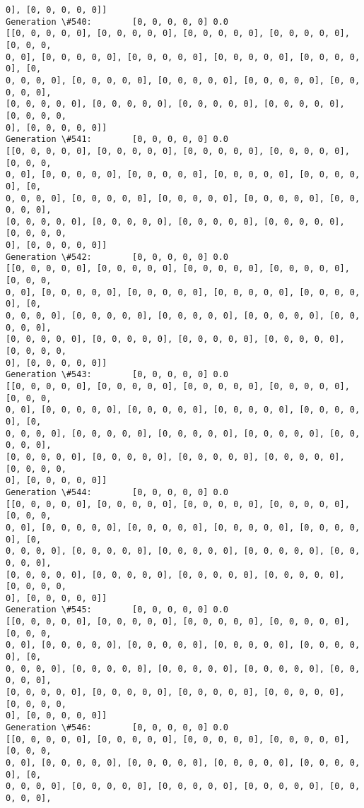 \documentclass[11pt]{article}
\begin{document}
\begin{Verbatim}[commandchars=\\\{\}]
0], [0, 0, 0, 0, 0]]
Generation \#540:        [0, 0, 0, 0, 0] 0.0
[[0, 0, 0, 0, 0], [0, 0, 0, 0, 0], [0, 0, 0, 0, 0], [0, 0, 0, 0, 0], [0, 0, 0,
0, 0], [0, 0, 0, 0, 0], [0, 0, 0, 0, 0], [0, 0, 0, 0, 0], [0, 0, 0, 0, 0], [0,
0, 0, 0, 0], [0, 0, 0, 0, 0], [0, 0, 0, 0, 0], [0, 0, 0, 0, 0], [0, 0, 0, 0, 0],
[0, 0, 0, 0, 0], [0, 0, 0, 0, 0], [0, 0, 0, 0, 0], [0, 0, 0, 0, 0], [0, 0, 0, 0,
0], [0, 0, 0, 0, 0]]
Generation \#541:        [0, 0, 0, 0, 0] 0.0
[[0, 0, 0, 0, 0], [0, 0, 0, 0, 0], [0, 0, 0, 0, 0], [0, 0, 0, 0, 0], [0, 0, 0,
0, 0], [0, 0, 0, 0, 0], [0, 0, 0, 0, 0], [0, 0, 0, 0, 0], [0, 0, 0, 0, 0], [0,
0, 0, 0, 0], [0, 0, 0, 0, 0], [0, 0, 0, 0, 0], [0, 0, 0, 0, 0], [0, 0, 0, 0, 0],
[0, 0, 0, 0, 0], [0, 0, 0, 0, 0], [0, 0, 0, 0, 0], [0, 0, 0, 0, 0], [0, 0, 0, 0,
0], [0, 0, 0, 0, 0]]
Generation \#542:        [0, 0, 0, 0, 0] 0.0
[[0, 0, 0, 0, 0], [0, 0, 0, 0, 0], [0, 0, 0, 0, 0], [0, 0, 0, 0, 0], [0, 0, 0,
0, 0], [0, 0, 0, 0, 0], [0, 0, 0, 0, 0], [0, 0, 0, 0, 0], [0, 0, 0, 0, 0], [0,
0, 0, 0, 0], [0, 0, 0, 0, 0], [0, 0, 0, 0, 0], [0, 0, 0, 0, 0], [0, 0, 0, 0, 0],
[0, 0, 0, 0, 0], [0, 0, 0, 0, 0], [0, 0, 0, 0, 0], [0, 0, 0, 0, 0], [0, 0, 0, 0,
0], [0, 0, 0, 0, 0]]
Generation \#543:        [0, 0, 0, 0, 0] 0.0
[[0, 0, 0, 0, 0], [0, 0, 0, 0, 0], [0, 0, 0, 0, 0], [0, 0, 0, 0, 0], [0, 0, 0,
0, 0], [0, 0, 0, 0, 0], [0, 0, 0, 0, 0], [0, 0, 0, 0, 0], [0, 0, 0, 0, 0], [0,
0, 0, 0, 0], [0, 0, 0, 0, 0], [0, 0, 0, 0, 0], [0, 0, 0, 0, 0], [0, 0, 0, 0, 0],
[0, 0, 0, 0, 0], [0, 0, 0, 0, 0], [0, 0, 0, 0, 0], [0, 0, 0, 0, 0], [0, 0, 0, 0,
0], [0, 0, 0, 0, 0]]
Generation \#544:        [0, 0, 0, 0, 0] 0.0
[[0, 0, 0, 0, 0], [0, 0, 0, 0, 0], [0, 0, 0, 0, 0], [0, 0, 0, 0, 0], [0, 0, 0,
0, 0], [0, 0, 0, 0, 0], [0, 0, 0, 0, 0], [0, 0, 0, 0, 0], [0, 0, 0, 0, 0], [0,
0, 0, 0, 0], [0, 0, 0, 0, 0], [0, 0, 0, 0, 0], [0, 0, 0, 0, 0], [0, 0, 0, 0, 0],
[0, 0, 0, 0, 0], [0, 0, 0, 0, 0], [0, 0, 0, 0, 0], [0, 0, 0, 0, 0], [0, 0, 0, 0,
0], [0, 0, 0, 0, 0]]
Generation \#545:        [0, 0, 0, 0, 0] 0.0
[[0, 0, 0, 0, 0], [0, 0, 0, 0, 0], [0, 0, 0, 0, 0], [0, 0, 0, 0, 0], [0, 0, 0,
0, 0], [0, 0, 0, 0, 0], [0, 0, 0, 0, 0], [0, 0, 0, 0, 0], [0, 0, 0, 0, 0], [0,
0, 0, 0, 0], [0, 0, 0, 0, 0], [0, 0, 0, 0, 0], [0, 0, 0, 0, 0], [0, 0, 0, 0, 0],
[0, 0, 0, 0, 0], [0, 0, 0, 0, 0], [0, 0, 0, 0, 0], [0, 0, 0, 0, 0], [0, 0, 0, 0,
0], [0, 0, 0, 0, 0]]
Generation \#546:        [0, 0, 0, 0, 0] 0.0
[[0, 0, 0, 0, 0], [0, 0, 0, 0, 0], [0, 0, 0, 0, 0], [0, 0, 0, 0, 0], [0, 0, 0,
0, 0], [0, 0, 0, 0, 0], [0, 0, 0, 0, 0], [0, 0, 0, 0, 0], [0, 0, 0, 0, 0], [0,
0, 0, 0, 0], [0, 0, 0, 0, 0], [0, 0, 0, 0, 0], [0, 0, 0, 0, 0], [0, 0, 0, 0, 0],

\end{Verbatim}
\end{document}
